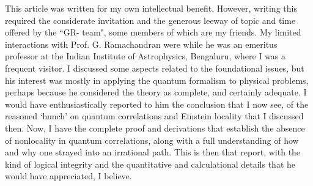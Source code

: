 This article was written for my own intellectual benefit. However, writing this required
the considerate invitation and the generous leeway of topic and time offered by the ``GR-
team", some members of which are my friends. My limited interactions with Prof. G.
Ramachandran were while he was an emeritus professor at the Indian Institute of Astrophysics, Bengaluru, where I was a frequent visitor. I discussed some aspects related to the
foundational issues, but his interest was mostly in applying the quantum formalism to physical problems, perhaps because he considered the theory as complete, and certainly adequate. I would have enthusiastically reported to him the conclusion that I now see, of the reasoned
`hunch' on quantum correlations and Einstein locality that I discussed then. Now, I have
the complete proof and derivations that establish the absence of nonlocality in quantum
correlations, along with a full understanding of how and why one strayed into an irrational
path. This is then that report, with the kind of logical integrity and the quantitative and
calculational details that he would have appreciated, I believe.

